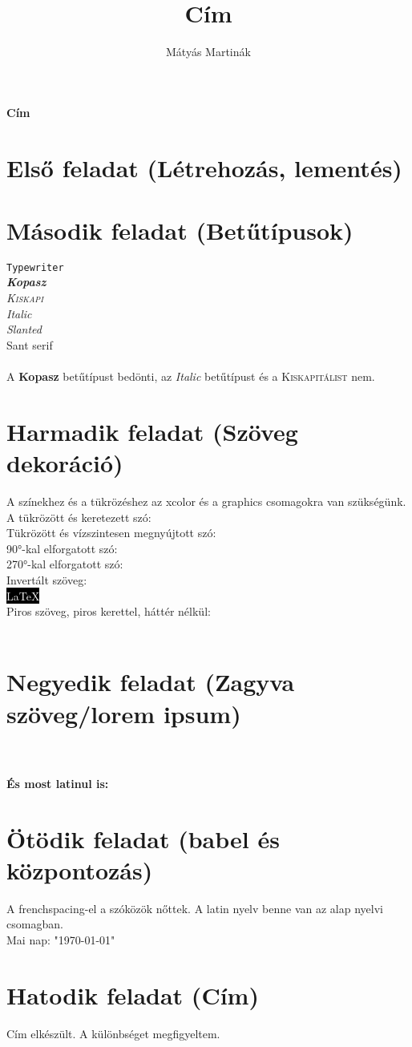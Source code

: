 \documentclass{book}
\begin{document}
\title{Cím}\textbf{\huge{Cím}}
\author{Mátyás Martinák}
\section{Első feladat (Létrehozás, lementés)}
\section{Második feladat (Betűtípusok)}
	\texttt{Typewriter}\\
	\emph{\textbf{Kopasz}}\\
	\emph{\textsc{Kiskapi}}\\
	\emph{\textit{Italic}}\\
	\textsl{Slanted}\\
	\textsf{Sant serif}\\\\
	A \textbf{Kopasz} betűtípust bedönti, az \textit{Italic} betűtípust és a \textsc{Kiskapitálist} nem.
\section{Harmadik feladat (Szöveg dekoráció)}
	A színekhez és a tükrözéshez az xcolor és a graphics csomagokra van szükségünk.\\
	A tükrözött és keretezett szó: \\
	Tükrözött és vízszintesen megnyújtott szó: \scalebox{2.0}{\scalebox{-1}[1]{\hulipsum[1]}}\\
	90°-kal elforgatott szó: \\
	270°-kal elforgatott szó: \\
	Invertált szöveg:\\
	\colorbox{black}{\textcolor{white}{\LaTeX}}\\
	Piros szöveg, piros kerettel, háttér nélkül:\\
	\\
\section{Negyedik feladat (Zagyva szöveg/lorem ipsum)}
	\hulipsum[1]\\\\
	\textbf{És most latinul is:}\\
	\begin{flushright}
		\begin{otherlanguage}{latin}
			\lipsum[1]
		\end{otherlanguage}
	\end{flushright}
	\linespread{2}
\section{Ötödik feladat (babel és központozás)}
	A frenchspacing-el a szóközök nőttek.
	A latin nyelv benne van az alap nyelvi csomagban.\\
	Mai nap: "\today"
\section{Hatodik feladat (Cím)}
	Cím elkészült.
	A különbséget megfigyeltem.
\end{document}
